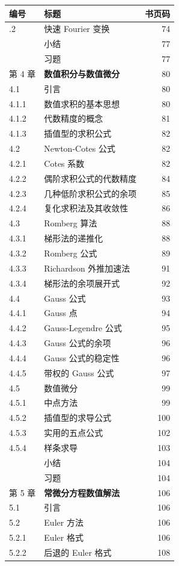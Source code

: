 {\def\LTcaptype{none} %
\begin{longtable}[]{@{}llr@{}}
\toprule\noalign{}
编号 & 标题 & 书页码 \\
\midrule\noalign{}
\endhead
\bottomrule\noalign{}
\endlastfoot
3.7.2 & 快速 Fourier 变换 & 74 \\
& 小结 & 77 \\
& 习题 & 77 \\
第 4 章 & \textbf{数值积分与数值微分} & 80 \\
4.1 & 引言 & 80 \\
4.1.1 & 数值求积的基本思想 & 80 \\
4.1.2 & 代数精度的概念 & 81 \\
4.1.3 & 插值型的求积公式 & 82 \\
4.2 & Newton-Cotes 公式 & 82 \\
4.2.1 & Cotes 系数 & 82 \\
4.2.2 & 偶阶求积公式的代数精度 & 84 \\
4.2.3 & 几种低阶求积公式的余项 & 85 \\
4.2.4 & 复化求积法及其收敛性 & 86 \\
4.3 & Romberg 算法 & 88 \\
4.3.1 & 梯形法的递推化 & 88 \\
4.3.2 & Romberg 公式 & 89 \\
4.3.3 & Richardson 外推加速法 & 91 \\
4.3.4 & 梯形法的余项展开式 & 92 \\
4.4 & Gauss 公式 & 93 \\
4.4.1 & Gauss 点 & 94 \\
4.4.2 & Gauss-Legendre 公式 & 95 \\
4.4.3 & Gauss 公式的余项 & 96 \\
4.4.4 & Gauss 公式的稳定性 & 96 \\
4.4.5 & 带权的 Gauss 公式 & 97 \\
4.5 & 数值微分 & 99 \\
4.5.1 & 中点方法 & 99 \\
4.5.2 & 插值型的求导公式 & 100 \\
4.5.3 & 实用的五点公式 & 102 \\
4.5.4 & 样条求导 & 103 \\
& 小结 & 104 \\
& 习题 & 104 \\
第 5 章 & \textbf{常微分方程数值解法} & 106 \\
5.1 & 引言 & 106 \\
5.2 & Euler 方法 & 106 \\
5.2.1 & Euler 格式 & 106 \\
5.2.2 & 后退的 Euler 格式 & 108 \\
\end{longtable}
}

